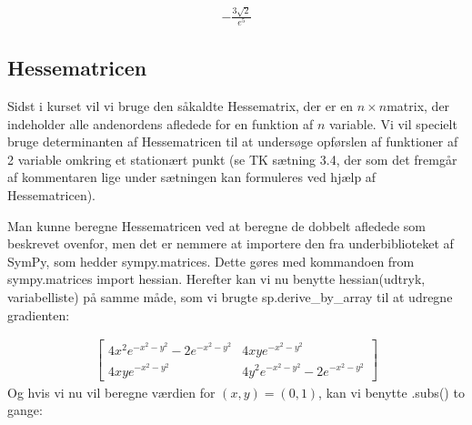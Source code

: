\documentclass[letterpaper,10pt,english]{jupyterBook}
\begin{document}
\begin{sphinxVerbatim}[commandchars=\\\{\}]
    
\end{sphinxVerbatim}
\begin{equation*}
\begin{split}\displaystyle - \frac{3 \sqrt{2}}{e^{5}}\end{split}
\end{equation*}

\subsection{Hessematricen}
\label{\detokenize{notebooks/sympy/Notebook_FlereVar_analyse:hessematricen}}
Sidst i kurset vil vi bruge den såkaldte Hessematrix, der er en \(n\times n\)\sphinxhyphen{}matrix, der indeholder alle andenordens afledede for en funktion af \(n\) variable. Vi vil specielt bruge determinanten af Hessematricen til at undersøge opførslen af funktioner af 2 variable omkring et stationært punkt (se TK sætning 3.4, der som det fremgår af kommentaren lige under sætningen kan formuleres ved hjælp af Hessematricen).

Man kunne beregne Hessematricen ved at beregne de dobbelt afledede som beskrevet ovenfor, men det er nemmere at importere den fra underbiblioteket af SymPy, som hedder sympy.matrices. Dette gøres med kommandoen from sympy.matrices import hessian. Herefter kan vi nu benytte hessian(udtryk, variabelliste) på samme måde, som vi brugte sp.derive\_by\_array til at udregne gradienten:

\begin{sphinxVerbatim}[commandchars=\\\{\}]
           
                   

   \PYG{p}{[} \PYG{p}{]}
\end{sphinxVerbatim}
\begin{equation*}
\begin{split}\displaystyle \left[\begin{matrix}4 x^{2} e^{- x^{2} - y^{2}} - 2 e^{- x^{2} - y^{2}} & 4 x y e^{- x^{2} - y^{2}}\\4 x y e^{- x^{2} - y^{2}} & 4 y^{2} e^{- x^{2} - y^{2}} - 2 e^{- x^{2} - y^{2}}\end{matrix}\right]\end{split}
\end{equation*}
Og hvis vi nu vil beregne værdien for \((x, y) = (0, 1)\), kan vi benytte .subs() to gange:
\end{document}
